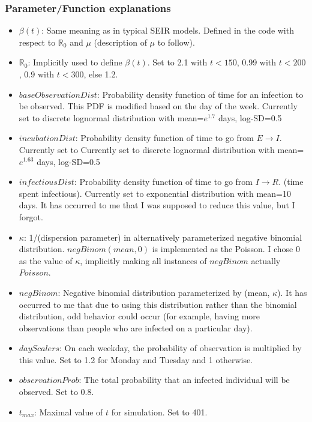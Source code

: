 \documentclass{article}
\newcommand{\nR}{\mathbb{R}}
\begin{document}
\subsubsection{Parameter/Function explanations}
\begin{itemize}
    \item $\beta(t)$: Same meaning as in typical SEIR models. Defined in the code with respect to $\nR_0$ and $\mu$ (description of $\mu$ to follow). 
    \item $\nR_0$: Implicitly used to define $\beta(t)$. Set to 2.1 with $t < 150$, 0.99 with $t<200$, 0.9 with $t<300$, else 1.2.
    \item $baseObservationDist$: Probability density function of time for an infection to be observed. This PDF is modified based on the day of the week. Currently set to discrete lognormal distribution with mean=$e^{1.7}$ days, log-SD=0.5 
    \item $incubationDist$: Probability density function of time to go from $E \rightarrow I$. Currently set to Currently set to discrete lognormal distribution with mean=$e^{1.63}$ days, log-SD=0.5 
    \item $infectiousDist$: Probability density function of time to go from $I \rightarrow R$. (time spent infectious). Currently set to exponential distribution with mean=10 days. It has occurred to me that I was supposed to reduce this value, but I forgot.
    \item $\kappa$: 1/(dispersion parameter) in alternatively parameterized negative binomial distribution. \cite{NegBinom} $negBinom(mean, 0)$ is implemented as the Poisson. I chose 0 as the value of $\kappa$, implicitly making all instances of $negBinom$ actually $Poisson$.
    \item $negBinom$: Negative binomial distribution parameterized by (mean, $\kappa$). It has occurred to me that due to using this distribution rather than the binomial distribution, odd behavior could occur (for example, having more observations than people who are infected on a particular day).
    \item $dayScalers$: On each weekday, the probability of observation is multiplied by this value. Set to 1.2 for Monday and Tuesday and 1 otherwise. 
    \item $observationProb$: The total probability that an infected individual will be observed. Set to 0.8.
    \item $t_{max}$: Maximal value of $t$ for simulation. Set to 401.
\end{itemize}
\end{document}
